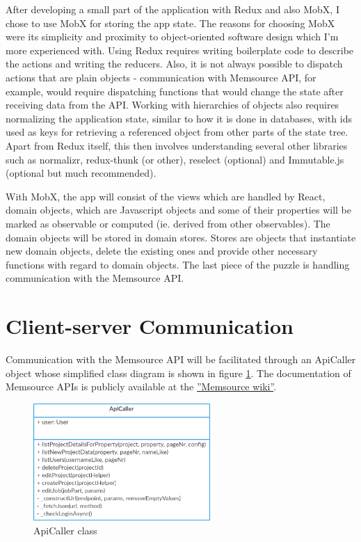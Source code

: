 


After developing a small part of the application with Redux and also MobX, I chose to use MobX for storing the app state. The reasons for choosing MobX were its simplicity and proximity to object-oriented software design which I'm more experienced with. 
Using Redux requires writing boilerplate code to describe the actions and writing the reducers. Also, it is not always possible to dispatch actions that are plain objects - communication with Memsource API, for example, would require dispatching functions that would change the state after receiving data from the API. Working with hierarchies of objects also requires normalizing the application state, similar to how it is done in databases, with ids used as keys for retrieving a referenced object from other parts of the state tree. Apart from Redux itself, this then involves understanding several other libraries such as normalizr, redux-thunk (or other), reselect (optional) and Immutable.js (optional but much recommended).


With MobX, the app will consist of the views which are handled by React, domain objects, which are Javascript objects and some of their properties will be marked as observable or computed (ie. derived from other observables). The domain objects will be stored in domain stores. Stores are objects that instantiate new domain objects, delete the existing ones and provide other necessary functions with regard to domain objects. The last piece of the puzzle is handling communication with the Memsource API.

\section{Client-server Communication}

Communication with the Memsource API will be facilitated through an ApiCaller object whose simplified class diagram is shown in figure \ref{ApiCaller}. The documentation of Memsource APIs is publicly available at the \href{http://wiki.memsource.com/wiki/Memsource_API#API_Reference}{''Memsource wiki''}.

\begin{figure}[H]
	\includegraphics[width=0.6\textwidth]{pics/ApiCaller}
	\caption{ApiCaller class}
	\label{ApiCaller}
\end{figure}


